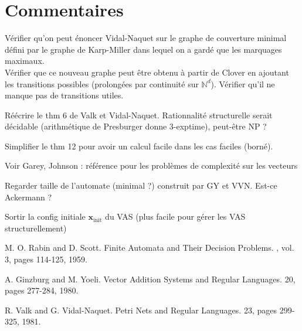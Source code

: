 \documentclass[a4paper,final]{article}
\theoremstyle{definition}
\newcommand{\N}{\ensuremath{\mathbb{N}}}
\newcommand{\vect}[1]{\ensuremath{\mathbf{#1}}}
\newcommand{\xinit}{\ensuremath{\vect{x}_\text{init}}}
\begin{document}

\section{Commentaires}
Vérifier qu'on peut énoncer Vidal-Naquet sur le graphe de couverture minimal défini par le graphe de Karp-Miller dans lequel on a gardé que les marquages maximaux.\\
Vérifier que ce nouveau graphe peut être obtenu à partir de Clover en ajoutant les transitions possibles (prolongées par continuité sur $\N^d$). Vérifier qu'il ne manque pas de transitions utiles.

Réécrire le thm 6 de Valk et Vidal-Naquet.
Rationnalité structurelle serait décidable (arithmétique de Presburger donne 3-exptime), peut-être NP ?

Simplifier le thm 12 pour avoir un calcul facile dans les cas faciles (borné).

Voir Garey, Johnson : référence pour les problèmes de complexité sur les vecteurs

Regarder taille de l'automate (minimal ?) construit par GY et VVN. Est-ce Ackermann ?

Sortir la config initiale $\xinit$ du VAS (plus facile pour gérer les VAS structurellement)


\begin{thebibliography}{10}

M. O. Rabin and D. Scott.
\newblock Finite Automata and Their Decision Problems.
, vol. 3, pages 114-125, 1959.

A. Ginzburg and M. Yoeli.
\newblock Vector Addition Systems and Regular Languages.
 20, pages 277-284, 1980.

R. Valk and G. Vidal-Naquet.
\newblock Petri Nets and Regular Languages.
 23, pages 299-325, 1981.

\end{thebibliography}
\end{document}
